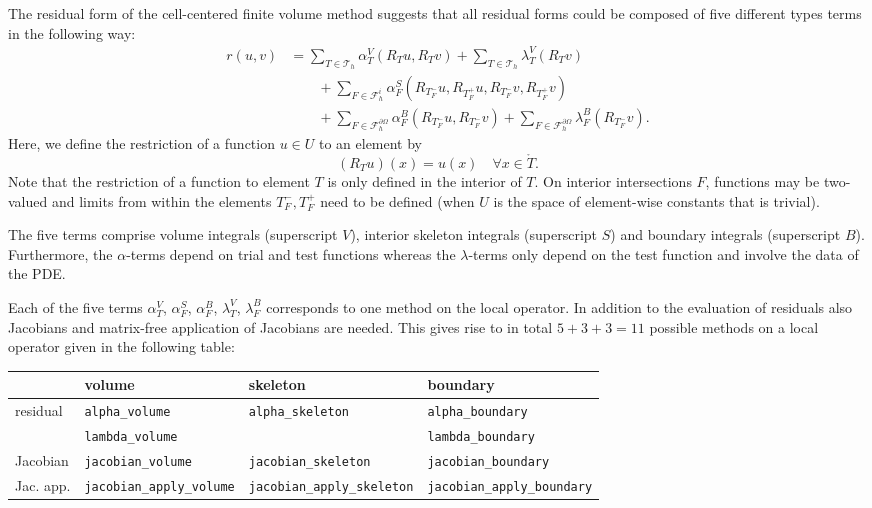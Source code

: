 \documentclass[a4paper,12pt]{article}
\begin{document}
The residual form of the cell-centered finite volume method suggests that 
all residual forms could be composed of five different types terms
in the following way:
\begin{equation}
\begin{split}
r(u,v) &= 
\sum_{T\in\mathcal{T}_h} \alpha_T^V(R_T u, R_T v) 
+ \sum_{T\in\mathcal{T}_h} \lambda_T^V(R_T v) \\
&\qquad+ \sum_{F\in\mathcal{F}_h^i} \alpha_F^S(R_{T_F^-} u,R_{T_F^+} u, R_{T_F^-} v, R_{T_F^+} v)\\
&\qquad+ \sum_{F\in\mathcal{F}_h^{\partial\Omega}} \alpha_F^B(R_{T_F^-} u, R_{T_F^-} v)
+ \sum_{F\in\mathcal{F}_h^{\partial\Omega}} \lambda_F^B(R_{T_F^-} v) .
\end{split}\label{eq:GeneralResidualForm}
\end{equation}
Here, we define the restriction
of a function $u\in U$ to an element by
\begin{equation*}
(R_T u)(x) = u(x) \quad \forall x\in\mathring{T} .
\end{equation*}
Note that the restriction of a function to element $T$ is only defined in
the interior of $T$. On interior intersections $F$, functions may be two-valued
and limits from within the elements $T_F^-, T_F^+$ need to be defined
(when $U$ is the space of element-wise constants that is trivial).

The five terms comprise volume integrals (superscript $V$), interior skeleton integrals
(superscript $S$) and boundary integrals (superscript $B$). Furthermore, the
$\alpha$-terms depend on trial and test functions whereas the $\lambda$-terms only
depend on the test function and involve the data of the PDE.

Each of the five terms $\alpha_T^V$, $\alpha_F^S$, $\alpha_F^B$, 
$\lambda_T^V$, $\lambda_F^B$ corresponds to one method on the
local operator.
In addition to the evaluation of residuals also Jacobians and
matrix-free application of Jacobians are needed. This gives rise
to in total $5+3+3=11$ possible methods on a local operator given in the following table:
\begin{center}
\footnotesize
\begin{tabular}{l|l|l|l}
    & volume & skeleton & boundary \\
\hline
residual    & \lstinline{alpha_volume} & \lstinline{alpha_skeleton} & \lstinline{alpha_boundary} \\
                & \lstinline{lambda_volume} & & \lstinline{lambda_boundary} \\
\hline
Jacobian  & \lstinline{jacobian_volume} & \lstinline{jacobian_skeleton} & \lstinline{jacobian_boundary} \\
\hline
Jac.  app.  & \lstinline{jacobian_apply_volume} & \lstinline{jacobian_apply_skeleton} &
\lstinline{jacobian_apply_boundary}
\end{tabular}
\end{center}
\end{document}

